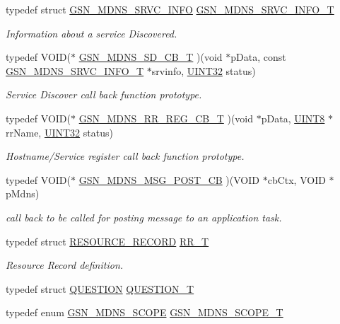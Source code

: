 \begin{DoxyCompactItemize}
typedef struct \hyperlink{a00146}{GSN\_\-MDNS\_\-SRVC\_\-INFO} \hyperlink{a00668_gaab0d47b6c1928b684129f17c0fbd1292}{GSN\_\-MDNS\_\-SRVC\_\-INFO\_\-T}
\begin{DoxyCompactList}\small\item\em Information about a service Discovered. \end{DoxyCompactList}\item 
typedef VOID($\ast$ \hyperlink{a00668_gaef8391be45a1399b7895289b3b56d632}{GSN\_\-MDNS\_\-SD\_\-CB\_\-T} )(void $\ast$pData, const \hyperlink{a00146}{GSN\_\-MDNS\_\-SRVC\_\-INFO\_\-T} $\ast$srvinfo, \hyperlink{a00660_gae1e6edbbc26d6fbc71a90190d0266018}{UINT32} status)
\begin{DoxyCompactList}\small\item\em Service Discover call back function prototype. \end{DoxyCompactList}\item 
typedef VOID($\ast$ \hyperlink{a00668_ga9c52fae5548745f14ef4e76fb05c2526}{GSN\_\-MDNS\_\-RR\_\-REG\_\-CB\_\-T} )(void $\ast$pData, \hyperlink{a00660_gab27e9918b538ce9d8ca692479b375b6a}{UINT8} $\ast$rrName, \hyperlink{a00660_gae1e6edbbc26d6fbc71a90190d0266018}{UINT32} status)
\begin{DoxyCompactList}\small\item\em Hostname/Service register call back function prototype. \end{DoxyCompactList}\item 
typedef VOID($\ast$ \hyperlink{a00668_ga9bb465f57992212c58689c8cf593e0e7}{GSN\_\-MDNS\_\-MSG\_\-POST\_\-CB} )(VOID $\ast$cbCtx, VOID $\ast$pMdns)
\begin{DoxyCompactList}\small\item\em call back to be called for posting message to an application task. \end{DoxyCompactList}\item 
typedef struct \hyperlink{a00457}{RESOURCE\_\-RECORD} \hyperlink{a00668_ga049805b69be0964873d9f51f9f783813}{RR\_\-T}
\begin{DoxyCompactList}\small\item\em Resource Record definition. \end{DoxyCompactList}\item 
typedef struct \hyperlink{a00455}{QUESTION} \hyperlink{a00526_a765e95a4adbd8d8a442ce10d731e9f7e}{QUESTION\_\-T}
\item 
typedef enum \hyperlink{a00668_gabcc090f962c26d23957861a30b6bf166}{GSN\_\-MDNS\_\-SCOPE} \hyperlink{a00668_ga628a2f0345628c6bb12ee21fee3790db}{GSN\_\-MDNS\_\-SCOPE\_\-T}

\end{DoxyCompactItemize}
